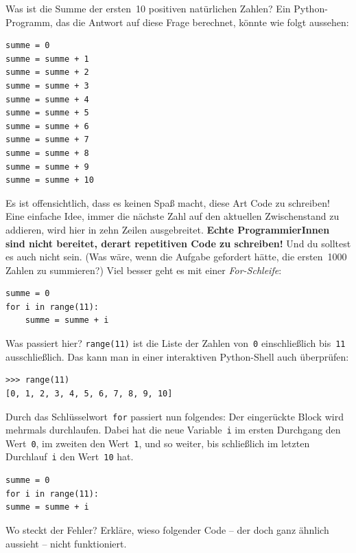 \documentclass{blatt}
\begin{document}
Was ist die Summe der ersten~10 positiven natürlichen Zahlen? Ein
Python-Programm, das die Antwort auf diese Frage berechnet, könnte wie folgt
aussehen:
\begin{verbatim}
summe = 0
summe = summe + 1
summe = summe + 2
summe = summe + 3
summe = summe + 4
summe = summe + 5
summe = summe + 6
summe = summe + 7
summe = summe + 8
summe = summe + 9
summe = summe + 10
\end{verbatim}
Es ist offensichtlich, dass es keinen Spaß macht, diese Art Code zu schreiben!
Eine einfache Idee, immer die nächste Zahl auf den aktuellen Zwischenstand zu
addieren, wird hier in zehn Zeilen ausgebreitet. \textbf{Echte ProgrammierInnen
sind nicht bereitet, derart repetitiven Code zu schreiben!} Und du solltest es
auch nicht sein. (Was wäre, wenn die Aufgabe gefordert hätte, die ersten~1000
Zahlen zu summieren?) Viel besser geht es mit einer \emph{For-Schleife}:
\begin{verbatim}
summe = 0
for i in range(11):
    summe = summe + i
\end{verbatim}
Was passiert hier? \texttt{range(11)} ist die Liste der Zahlen
von~\texttt{0} einschließlich bis~\texttt{11}
ausschließlich. Das kann man in einer interaktiven Python-Shell auch
überprüfen:
\begin{verbatim}
>>> range(11)
[0, 1, 2, 3, 4, 5, 6, 7, 8, 9, 10]
\end{verbatim}
Durch das Schlüsselwort~\texttt{for} passiert nun folgendes: Der
eingerückte Block wird mehrmals durchlaufen. Dabei hat die neue
Variable~\texttt{i} im ersten Durchgang den
Wert~\texttt{0}, im zweiten den Wert~\texttt{1}, und so
weiter, bis schließlich im letzten Durchlauf~\texttt{i} den
Wert~\texttt{10} hat.

\begin{lrbox}{\foobox}\begin{minipage}{\textwidth}\begin{verbatim}
summe = 0
for i in range(11):
summe = summe + i
\end{verbatim}
\end{minipage}\end{lrbox}
\begin{aufgabe}{Wo steckt der Fehler?}
Erkläre, wieso folgender Code -- der doch ganz ähnlich aussieht -- nicht
funktioniert.

\usebox{\foobox}
\end{aufgabe}
\end{document}
